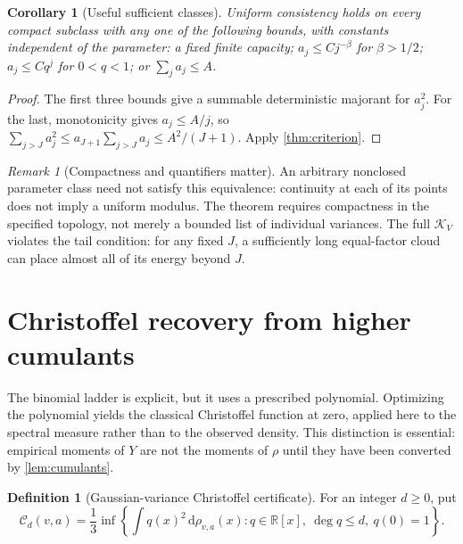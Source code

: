 \documentclass[11pt,letterpaper]{article}
\numberwithin{equation}{section}
\newtheorem{corollary}[theorem]{Corollary}
\theoremstyle{definition}
\newtheorem{definition}[theorem]{Definition}
\theoremstyle{remark}
\newtheorem{remark}[theorem]{Remark}
\newcommand{\R}{\mathbb R}
\newcommand{\dd}{\,\mathrm d}
\newcommand{\K}{\mathcal K_V}
\newcommand{\Cs}{\mathcal C}
\begin{document}
\begin{corollary}[Useful sufficient classes]
\label{cor:classes}
Uniform consistency holds on every compact subclass with any one of the
following bounds, with constants independent of the parameter: a fixed finite
capacity; $a_j\le Cj^{-\beta}$ for $\beta>1/2$; $a_j\le Cq^j$ for $0<q<1$;
or $\sum_j a_j\le A$.
\end{corollary}
\begin{proof}
The first three bounds give a summable deterministic majorant for $a_j^2$.
For the last, monotonicity gives $a_j\le A/j$, so
$\sum_{j>J}a_j^2\le a_{J+1}\sum_{j>J}a_j\le A^2/(J+1)$.
Apply \cref{thm:criterion}.
\end{proof}

\begin{remark}[Compactness and quantifiers matter]
An arbitrary nonclosed parameter class need not satisfy this equivalence:
continuity at each of its points does not imply a uniform modulus.
The theorem requires compactness in the specified topology, not merely a
bounded list of individual variances. The full $\K$ violates the tail
condition: for any fixed $J$, a sufficiently long equal-factor cloud can
place almost all of its energy beyond $J$.
\end{remark}

\section{Christoffel recovery from higher cumulants}
\label{sec:christoffel}

The binomial ladder is explicit, but it uses a prescribed polynomial.
Optimizing the polynomial yields the classical Christoffel function at zero,
applied here to the spectral measure rather than to the observed density.
This distinction is essential: empirical moments of $Y$ are not the moments
of $\rho$ until they have been converted by \cref{lem:cumulants}.

\begin{definition}[Gaussian-variance Christoffel certificate]
For an integer $d\ge0$, put
\begin{equation}
 \Cs_d(v,a)=\frac13
   \inf\left\{\int q(x)^2\dd\rho_{v,a}(x):
          q\in\R[x],\ \deg q\le d,\ q(0)=1\right\}.
 \label{eq:christoffel}
\end{equation}
\end{definition}
\end{document}
